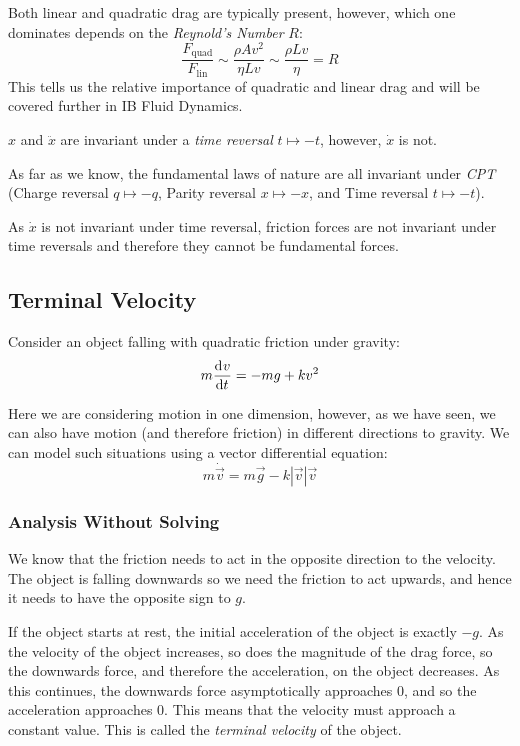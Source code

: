 \documentclass[../main.tex]{subfiles}
\begin{document}
Both linear and quadratic drag are typically present, however, which one dominates depends on the \textit{Reynold's Number} $R$:
\[
  \frac{F_{\text{quad}}}{F_{\text{lin}}} \sim \frac{\rho A v^2}{\eta L v} \sim \frac{\rho L v}{\eta} = R
\]
This tells us the relative importance of quadratic and linear drag and will be covered further in IB Fluid Dynamics.
\begin{remark}
  $x$ and $\ddot{x}$ are invariant under a \textit{time reversal} $t \mapsto -t$, however, $\dot{x}$ is not.

  As far as we know, the fundamental laws of nature are all invariant under \textit{CPT} (Charge reversal $q \mapsto -q$, Parity reversal $x \mapsto -x$, and Time reversal $t \mapsto -t$).

  As $\dot{x}$ is not invariant under time reversal, friction forces are not invariant under time reversals and therefore they cannot be fundamental forces.
\end{remark}
\subsection{Terminal Velocity}
Consider an object falling with quadratic friction under gravity:
\begin{equation}
  m \deriv{v}{t} = - mg + kv^2 \label{termDE}
\end{equation}
\begin{remark}[Note]
  Here we are considering motion in one dimension, however, as we have seen, we can also have motion (and therefore friction) in different directions to gravity.
  We can model such situations using a vector differential equation:
  \[
    m \dot{\vec{v}} = m\vec{g} - k|\vec{v}|\vec{v}
  \]
\end{remark}
\subsubsection{Analysis Without Solving}
We know that the friction needs to act in the opposite direction to the velocity.
The object is falling downwards so we need the friction to act upwards, and hence it needs to have the opposite sign to $g$.

If the object starts at rest, the initial acceleration of the object is exactly $-g$.
As the velocity of the object increases, so does the magnitude of the drag force, so the downwards force, and therefore the acceleration, on the object decreases.
As this continues, the downwards force asymptotically approaches 0, and so the acceleration approaches 0.
This means that the velocity must approach a constant value.
This is called the \textit{terminal velocity} of the object.
\end{document}
